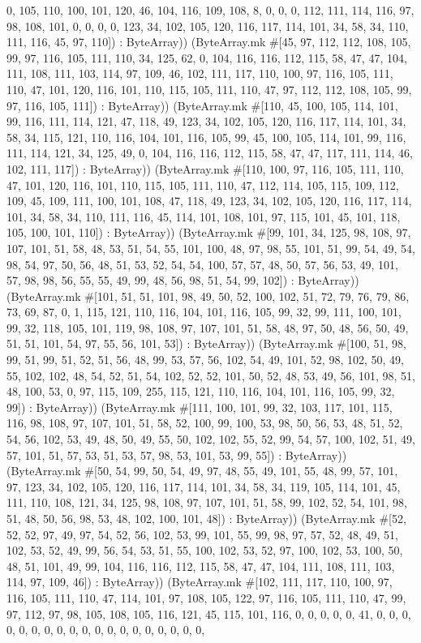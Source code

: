 \documentclass[11pt]{article}
\begin{document}
0, 105, 110, 100, 101, 120, 46, 104, 116, 109, 108, 8, 0, 0, 0, 112, 111, 114, 116, 97, 98, 108, 101, 0, 0, 0, 0, 123, 34, 102, 105, 120, 116, 117, 114, 101, 34, 58, 34, 110, 111, 116, 45, 97, 110]) : ByteArray)) (ByteArray.mk \#[45, 97, 112, 112, 108, 105, 99, 97, 116, 105, 111, 110, 34, 125, 62, 0, 104, 116, 116, 112, 115, 58, 47, 47, 104, 111, 108, 111, 103, 114, 97, 109, 46, 102, 111, 117, 110, 100, 97, 116, 105, 111, 110, 47, 101, 120, 116, 101, 110, 115, 105, 111, 110, 47, 97, 112, 112, 108, 105, 99, 97, 116, 105, 111]) : ByteArray)) (ByteArray.mk \#[110, 45, 100, 105, 114, 101, 99, 116, 111, 114, 121, 47, 118, 49, 123, 34, 102, 105, 120, 116, 117, 114, 101, 34, 58, 34, 115, 121, 110, 116, 104, 101, 116, 105, 99, 45, 100, 105, 114, 101, 99, 116, 111, 114, 121, 34, 125, 49, 0, 104, 116, 116, 112, 115, 58, 47, 47, 117, 111, 114, 46, 102, 111, 117]) : ByteArray)) (ByteArray.mk \#[110, 100, 97, 116, 105, 111, 110, 47, 101, 120, 116, 101, 110, 115, 105, 111, 110, 47, 112, 114, 105, 115, 109, 112, 109, 45, 109, 111, 100, 101, 108, 47, 118, 49, 123, 34, 102, 105, 120, 116, 117, 114, 101, 34, 58, 34, 110, 111, 116, 45, 114, 101, 108, 101, 97, 115, 101, 45, 101, 118, 105, 100, 101, 110]) : ByteArray)) (ByteArray.mk \#[99, 101, 34, 125, 98, 108, 97, 107, 101, 51, 58, 48, 53, 51, 54, 55, 101, 100, 48, 97, 98, 55, 101, 51, 99, 54, 49, 54, 98, 54, 97, 50, 56, 48, 51, 53, 52, 54, 54, 100, 57, 57, 48, 50, 57, 56, 53, 49, 101, 57, 98, 98, 56, 55, 55, 49, 99, 48, 56, 98, 51, 54, 99, 102]) : ByteArray)) (ByteArray.mk \#[101, 51, 51, 101, 98, 49, 50, 52, 100, 102, 51, 72, 79, 76, 79, 86, 73, 69, 87, 0, 1, 115, 121, 110, 116, 104, 101, 116, 105, 99, 32, 99, 111, 100, 101, 99, 32, 118, 105, 101, 119, 98, 108, 97, 107, 101, 51, 58, 48, 97, 50, 48, 56, 50, 49, 51, 51, 101, 54, 97, 55, 56, 101, 53]) : ByteArray)) (ByteArray.mk \#[100, 51, 98, 99, 51, 99, 51, 52, 51, 56, 48, 99, 53, 57, 56, 102, 54, 49, 101, 52, 98, 102, 50, 49, 55, 102, 102, 48, 54, 52, 51, 54, 102, 52, 52, 101, 50, 52, 48, 53, 49, 56, 101, 98, 51, 48, 100, 53, 0, 97, 115, 109, 255, 115, 121, 110, 116, 104, 101, 116, 105, 99, 32, 99]) : ByteArray)) (ByteArray.mk \#[111, 100, 101, 99, 32, 103, 117, 101, 115, 116, 98, 108, 97, 107, 101, 51, 58, 52, 100, 99, 100, 53, 98, 50, 56, 53, 48, 51, 52, 54, 56, 102, 53, 49, 48, 50, 49, 55, 50, 102, 102, 55, 52, 99, 54, 57, 100, 102, 51, 49, 57, 101, 51, 57, 53, 51, 53, 57, 98, 53, 101, 53, 99, 55]) : ByteArray)) (ByteArray.mk \#[50, 54, 99, 50, 54, 49, 97, 48, 55, 49, 101, 55, 48, 99, 57, 101, 97, 123, 34, 102, 105, 120, 116, 117, 114, 101, 34, 58, 34, 119, 105, 114, 101, 45, 111, 110, 108, 121, 34, 125, 98, 108, 97, 107, 101, 51, 58, 99, 102, 52, 54, 101, 98, 51, 48, 50, 56, 98, 53, 48, 102, 100, 101, 48]) : ByteArray)) (ByteArray.mk \#[52, 52, 52, 97, 49, 97, 54, 52, 56, 102, 53, 99, 101, 55, 99, 98, 97, 57, 52, 48, 49, 51, 102, 53, 52, 49, 99, 56, 54, 53, 51, 55, 100, 102, 53, 52, 97, 100, 102, 53, 100, 50, 48, 51, 101, 49, 99, 104, 116, 116, 112, 115, 58, 47, 47, 104, 111, 108, 111, 103, 114, 97, 109, 46]) : ByteArray)) (ByteArray.mk \#[102, 111, 117, 110, 100, 97, 116, 105, 111, 110, 47, 114, 101, 97, 108, 105, 122, 97, 116, 105, 111, 110, 47, 99, 97, 112, 97, 98, 105, 108, 105, 116, 121, 45, 115, 101, 116, 0, 0, 0, 0, 0, 41, 0, 0, 0, 0, 0, 0, 0, 0, 0, 0, 0, 0, 0, 0, 0, 0, 0, 0, 0, 
\end{document}
